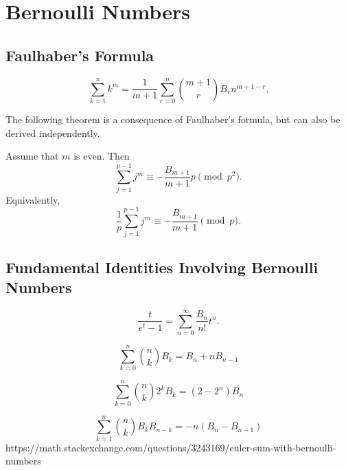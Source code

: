 \chapter{Bernoulli Numbers}

\section{Faulhaber's Formula}

\begin{theorem}
  \begin{equation*}
    \sum_{k=1}^n k^m = \frac{1}{m+1}\sum_{r=0}^n\binom{m+1}{r} B_r n^{m+1-r}.
  \end{equation*}
\end{theorem}

The following theorem is a consequence of Faulhaber's formula, but can also be derived independently.

\begin{theorem}
  Assume that $m$ is even. Then
  \begin{equation*}
    \sum_{j=1}^{p-1} j^m\equiv -\frac{B_{m+1}}{m+1} p\pmod{p^2}.
  \end{equation*}
  Equivalently,
  \begin{equation*}
    \frac{1}{p}\sum_{j=1}^{p-1} j^m\equiv -\frac{B_{m+1}}{m+1}\pmod{p}.
  \end{equation*}
\end{theorem}

\section{Fundamental Identities Involving Bernoulli Numbers}

\begin{equation*}
  \frac{t}{e^t-1}=\sum_{n=0}^{\infty}\frac{B_n}{n!} t^n.
\end{equation*}

\begin{equation*}
  \sum_{k=0}^n\binom{n}{k}B_k = B_n+nB_{n-1}
\end{equation*}

\begin{equation*}
  \sum_{k=0}^n\binom{n}{k}2^kB_k = (2-2^n)B_n  
\end{equation*}

\begin{equation*}
  \sum_{k=1}^n\binom{n}{k} B_k B_{n-k}=-n(B_n - B_{n-1})
\end{equation*}
https://math.stackexchange.com/questions/3243169/euler-sum-with-bernoulli-numbers

